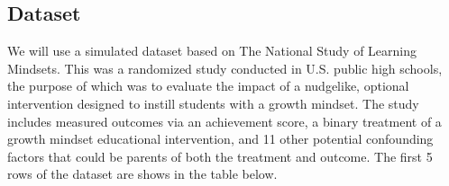 \documentclass[letterpaper,10pt,english]{jupyterBook}
\begin{document}
\subsection{Dataset}
\label{\detokenize{DR_Methods:dataset}}
\sphinxAtStartPar
We will use a simulated dataset based on The National Study of Learning Mindsets. This was a randomized study conducted in U.S. public high schools, the purpose of which was to evaluate the impact of a nudge\sphinxhyphen{}like, optional intervention designed to instill students with a growth mindset. The study includes measured outcomes via an achievement score, a binary treatment of a growth mindset educational intervention, and 11 other potential confounding factors that could be parents of both the treatment and outcome. The first 5 rows of the dataset are shows in the table below.
\end{document}
